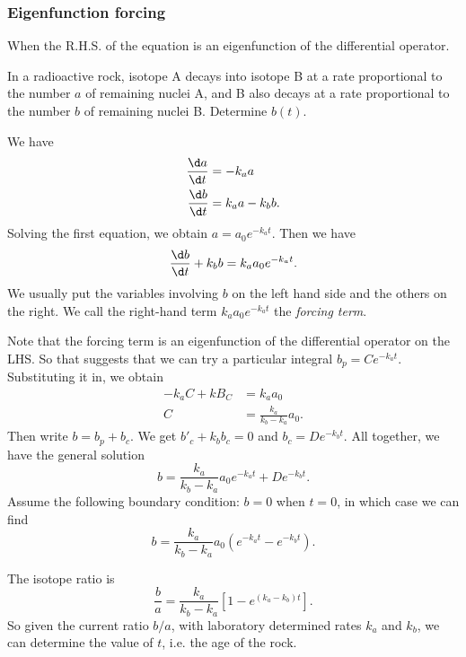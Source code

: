 \documentclass[a4paper]{article}
\begin{document}
\subsubsection{Eigenfunction forcing}
When the R.H.S. of the equation is an eigenfunction of the differential operator.
\begin{eg}
  In a radioactive rock, isotope A decays into isotope B at a rate proportional to the number $a$ of remaining nuclei A, and B also decays at a rate proportional to the number $b$ of remaining nuclei B. Determine $b(t)$.

  We have
  \begin{align*}
    \frac{\d a}{\d t} &= -k_a a\\
    \frac{\d b}{\d t} &= k_a a - k_b b.
  \end{align*}
  Solving the first equation, we obtain $a = a_0e^{-k_at}$. Then we have
  \[
  \frac{\d b}{\d t} + k_b b = k_aa_0e^{-k_at}.
  \]
  We usually put the variables involving $b$ on the left hand side and the others on the right. We call the right-hand term $k_aa_0e^{-k_at}$ the \emph{forcing term}.

  Note that the forcing term is an eigenfunction of the differential operator on the LHS. So that suggests that we can try a particular integral $b_p = Ce^{-k_at}$. Substituting it in, we obtain
  \begin{align*}
    -k_aC + kB_C &= k_a a_0\\
    C &= \frac{k_a}{k_b - k_a}a_0.
  \end{align*}
  Then write $b = b_p + b_c$. We get $b'_c + k_bb_c = 0$ and $b_c = De^{-k_bt}$. All together, we have the general solution
  \[
  b = \frac{k_a}{k_b - k_a}a_0 e^{-k_at} + De^{-k_bt}.
  \]
  Assume the following boundary condition: $b = 0$ when $t = 0$, in which case we can find 
  \[
  b = \frac{k_a}{k_b - k_a}a_0\left(e^{-k_at} - e^{-k_bt}\right).
  \]
  \begin{center}
  \end{center}
  The isotope ratio is
  \[
  \frac{b}{a} = \frac{k_a}{k_b - k_a}\left[1 - e^{(k_a - k_b)t}\right].
  \]
  So given the current ratio $b/a$, with laboratory determined rates $k_a$ and $k_b$, we can determine the value of $t$, i.e. the age of the rock.
\end{eg}
\end{document}
